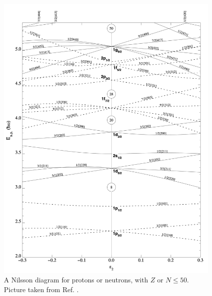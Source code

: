 \begin{figure}
    \centering
    \includegraphics[width=0.99\textwidth]{Chapters/Figures/nillson_diagram.png}
    \caption{A Nilsson diagram for protons or neutrons, with $Z$ or $N\leq50$. Picture taken from Ref. \cite{ragnarsson2005shapes}.}
    \label{nillson-diagram}
\end{figure}

